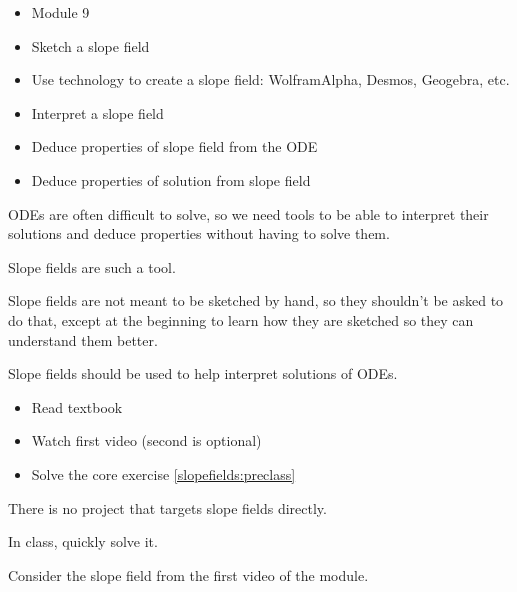 \begin{lesson}

	\begin{itemize}
		\item Module 9
	\end{itemize}

	\begin{itemize}
		\item Sketch a slope field
		\item Use technology to create a slope field: WolframAlpha, Desmos, Geogebra, etc.
		\item Interpret a slope field
		\item Deduce properties of slope field from the ODE
		\item Deduce properties of solution from slope field
	\end{itemize}
	

ODEs are often difficult to solve, so we need tools to be able to interpret their solutions and deduce properties without having to solve them.

Slope fields are such a tool. 

Slope fields are not meant to be sketched by hand, so they shouldn't be asked to do that, except at the beginning to learn how they are sketched so they can understand them better. 

Slope fields should be used to help interpret solutions of ODEs.



\begin{itemize}
	\item Read textbook
	\item Watch first video (second is optional)
	\item Solve the core exercise \ref{slopefields:preclass}
\end{itemize}
 
 
 
There is no project that targets slope fields directly.

\end{lesson}








\begin{annotation}
\begin{goals}
	
	In class, quickly solve it.
\end{goals}	
\end{annotation}
\question \label{slopefields:preclass}
	Consider the slope field from the first video of the module.
	
